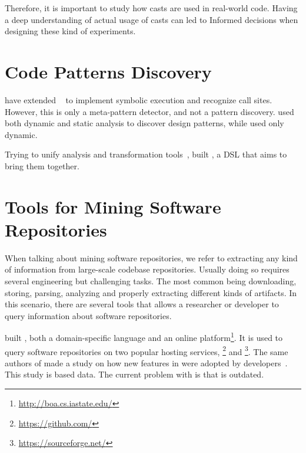 Therefore, it is important to study how casts are used in real-world code. 
Having a deep understanding of actual usage of casts can led to 
Informed decisions when designing these kind of experiments. 

\section{Code Patterns Discovery}
\label{sec:rw:patterns}

\cite{posnettTHEXMiningMetapatterns2010} have extended \asm{}~\cite{brunetonASMCodeManipulation2002,kuleshovUsingASMFramework2007} to implement symbolic execution and recognize call sites.
However, this is only a meta-pattern detector, and not a pattern discovery.
\cite{huDynamicAnalysisDesign2008} used both dynamic and static analysis to discover design patterns, while \cite{arcelliDesignPatternDetection2008} used only dynamic.

Trying to unify analysis and transformation tools~\cite{vinjuHowMakeBridge2006}, \cite{klintRASCALDomainSpecific2009} built \rascal, a DSL that aims to bring them together.


\section{Tools for Mining Software Repositories}
\label{sec:rw:mining}

When talking about mining software repositories, we refer to extracting any kind of information from large-scale codebase repositories. 
Usually doing so requires several engineering but challenging tasks.
The most common being downloading, storing, parsing, analyzing and properly extracting different kinds of artifacts.
In this scenario, there are several tools that allows a researcher or developer to query information about software repositories.

\cite{dyerBoaLanguageInfrastructure2013,dyerDeclarativeVisitorsEase2013} built \boa{}, both a domain-specific language and an online platform\footnote{\url{http://boa.cs.iastate.edu/}}. 
It is used to query software repositories on two popular hosting services, \github \footnote{\url{https://github.com/}} and \sourceforge \footnote{\url{https://sourceforge.net/}}.
The same authors of \boa{} made a study on how new features in \java{} were adopted by developers~\cite{dyerMiningBillionsAST2014}.
This study is based \sourceforge{} data.
The current problem with \sourceforge{} is that is outdated.

